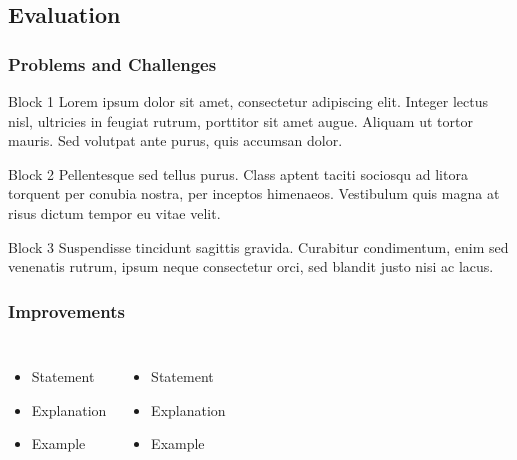 \documentclass{beamer}
\begin{document}
\subsection{Evaluation}


\begin{frame}
\frametitle{Problems and Challenges}


\begin{block}{Block 1}
Lorem ipsum dolor sit amet, consectetur adipiscing elit. Integer lectus nisl, ultricies in feugiat rutrum, porttitor sit amet augue. Aliquam ut tortor mauris. Sed volutpat ante purus, quis accumsan dolor.
\end{block}

\begin{block}{Block 2}
Pellentesque sed tellus purus. Class aptent taciti sociosqu ad litora torquent per conubia nostra, per inceptos himenaeos. Vestibulum quis magna at risus dictum tempor eu vitae velit.
\end{block}

\begin{block}{Block 3}
Suspendisse tincidunt sagittis gravida. Curabitur condimentum, enim sed venenatis rutrum, ipsum neque consectetur orci, sed blandit justo nisi ac lacus.
\end{block}



\end{frame}


\begin{frame}
\frametitle{Improvements}
\begin{columns}[t] %

\begin{itemize}
\item Statement
\item Explanation
\item Example
\end{itemize}



\begin{itemize}
\item Statement
\item Explanation
\item Example
\end{itemize}

\end{columns}
\end{frame}
\end{document}

